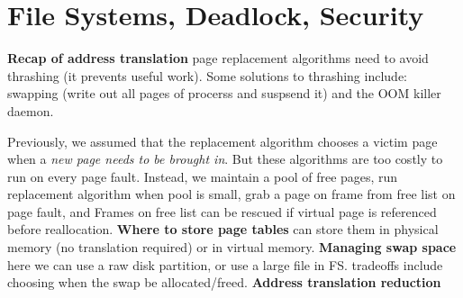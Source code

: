 \section{File Systems, Deadlock, Security}

{\bf Recap of address
translation}
page replacement algorithms need to avoid thrashing (it prevents useful work). Some solutions
to thrashing include: swapping (write out all pages of procerss and suspsend it) and the OOM killer daemon.

Previously, we assumed that the replacement algorithm chooses a victim page
when a \emph{new page needs to be brought in}. But these algorithms are too
costly to run on every page fault. Instead, we maintain a pool of free pages,
run replacement algorithm when pool is small, grab a page on frame from free
list on page fault, and Frames on free list can be rescued if virtual page is
referenced before reallocation.
{\bf Where to store page
tables } can store them in physical memory (no translation required) or in virtual memory.
{\bf Managing swap space} here we can use a raw disk partition, or use a large
file in FS. tradeoffs include choosing when the swap be allocated/freed.
{\bf Address translation
reduction}

